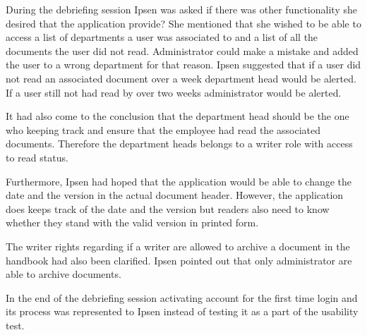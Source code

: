 
During the debriefing session Ipsen was asked if there was other functionality she desired that the application provide?
She mentioned that she wished to be able to access a list of departments a user was associated to and a list of all the documents the user did not read. 
Administrator could make a mistake and added the user to a wrong department for that reason. 
Ipsen suggested that if a user did not read an associated document over a week department head would be alerted.
If a user still not had read by over two weeks administrator would be alerted. 

It had also come to the conclusion that the department head should be the one who keeping track and ensure that the employee had read the associated documents. 
Therefore the department heads belongs to a writer role with access to read status. 

Furthermore, Ipsen had hoped that the application would be able to change the date and the version in the actual document header. 
However, the application does keeps track of the date and the version but readers also need to know whether they stand with the valid version in printed form. 

The writer rights regarding if a writer are allowed to archive a document in the handbook had also been clarified. 
Ipsen pointed out that only administrator are able to archive documents. 

In the end of the debriefing session activating account for the first time login and its process was represented to Ipsen instead of testing it as a part of the usability test. 




